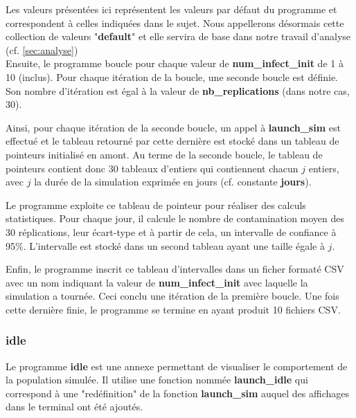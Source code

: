 \documentclass[12pt,french,titlepage]{article}
\begin{document}
Les valeurs présentées ici représentent les valeurs par défaut du programme et correspondent à celles indiquées dans le sujet. Nous appellerons désormais cette collection de valeurs "\textbf{default}" et elle servira de base dans notre travail d'analyse (cf. \ref{sec:analyse})\\

Ensuite, le programme boucle pour chaque valeur de \textbf{num\_infect\_init} de 1 à 10 (inclus). Pour chaque itération de la boucle, une seconde boucle est définie. Son nombre d'itération est égal à la valeur de \textbf{nb\_replications} (dans notre cas, 30). 

Ainsi, pour chaque itération de la seconde boucle, un appel à \textbf{launch\_sim} est effectué et le tableau retourné par cette dernière est stocké dans un tableau de pointeurs initialisé en amont. Au terme de la seconde boucle, le tableau de pointeurs contient donc 30 tableaux d'entiers qui contiennent chacun $j$ entiers, avec $j$ la durée de la simulation exprimée en jours (cf. constante \textbf{jours}).


Le programme exploite ce tableau de pointeur pour réaliser des calculs statistiques. Pour chaque jour, il calcule le nombre de contamination moyen des 30 réplications, leur écart-type et à partir de cela, un intervalle de confiance à 95\%. L'intervalle est stocké dans un second tableau ayant une taille égale à $j$.

Enfin, le programme inscrit ce tableau d'intervalles dans un ficher formaté CSV avec un nom indiquant la valeur de \textbf{num\_infect\_init} avec laquelle la simulation a tournée. Ceci conclu une itération de la première boucle. Une fois cette dernière finie, le programme se termine en ayant produit 10 fichiers CSV.

\subsubsection{idle}
Le programme \textbf{idle} est une annexe permettant de visualiser le comportement de la population simulée. Il utilise une fonction nommée \textbf{launch\_idle} qui correspond à une "redéfinition" de la fonction \textbf{launch\_sim} auquel des affichages dans le terminal ont été ajoutés.\\
\end{document}
